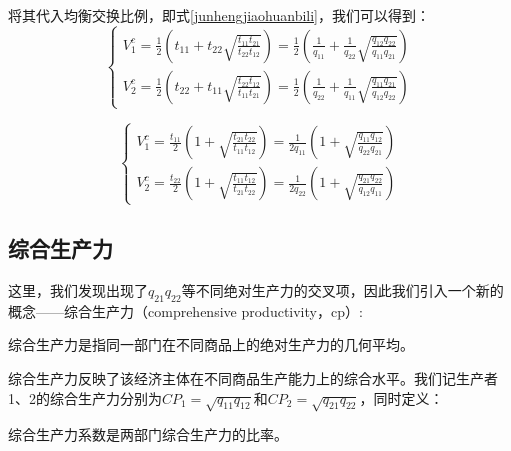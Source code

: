将其代入均衡交换比例，即式\ref{junhengjiaohuanbili}，我们可以得到\cite[70-71]{CaiJiMingCongXiaYiJieZhiLunDaoGuangYiJieZhiLunXiuDingBan2022}：
\begin{equation}
    \begin{cases}
        V^c_1 = \frac{1}{2}\left(t_{11}+t_{22}\sqrt{\frac{t_{11} t_{21}}{t_{22} t_{12}}}\right)=\frac{1}{2}\left(\frac{1}{q_{11}}+\frac{1}{q_{22}}\sqrt{\frac{q_{12}q_{22}}{q_{11}q_{21}}}\right) \\
        V^c_2 =\frac{1}{2}\left(t_{22}+t_{11}\sqrt{\frac{t_{22} t_{12}}{t_{11} t_{21}}}\right) = \frac{1}{2}\left( \frac{1}{q_{22}}+\frac{1}{q_{11}}\sqrt{\frac{q_{11}q_{21}}{q_{12}q_{22}}}\right)
    \end{cases}
\end{equation}

\begin{equation}
    \label{danweishangpingdejiazhi}
    \begin{cases}
        V^c_1 = \frac{t_{11}}{2}\left(1+\sqrt{\frac{t_{21}t_{22}}{t_{11}t_{12}}}\right)=\frac{1}{2q_{11}}\left(1+\sqrt{\frac{q_{11}q_{12}}{q_{22}q_{21}}}\right) \\

        V^c_2 = \frac{t_{22}}{2}\left(1+\sqrt{\frac{t_{11}t_{12}}{t_{21}t_{22}}}\right)=\frac{1}{2q_{22}}\left(1+\sqrt{\frac{q_{21}q_{22}}{q_{12}q_{11}}}\right)
    \end{cases}
\end{equation}

\subsection{综合生产力}

这里，我们发现出现了$q_{21}q_{22}$等不同绝对生产力的交叉项，因此我们引入一个新的概念——综合生产力（comprehensive productivity，cp）:
\begin{definition}
    综合生产力是指同一部门在不同商品上的绝对生产力的几何平均\cite[81]{CaiJiMingCongXiaYiJieZhiLunDaoGuangYiJieZhiLunXiuDingBan2022}。
\end{definition}

综合生产力反映了该经济主体在不同商品生产能力上的综合水平\cite[81]{CaiJiMingCongXiaYiJieZhiLunDaoGuangYiJieZhiLunXiuDingBan2022}。我们记生产者1、2的综合生产力分别为$ \mathit{CP}_1 = \sqrt{q_{11}q_{12}} $和$ \mathit{CP}_2 = \sqrt{q_{21}q_{22}} $，同时定义：
\begin{definition}
    综合生产力系数是两部门综合生产力的比率\cite[71]{CaiJiMingCongXiaYiJieZhiLunDaoGuangYiJieZhiLunXiuDingBan2022}。
\end{definition}

